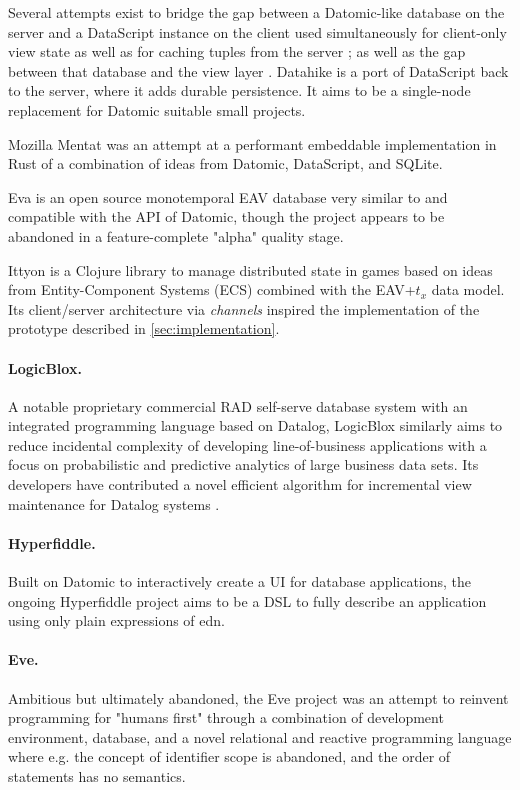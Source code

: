 Several attempts exist to bridge the gap between a Datomic-like database on the server and a DataScript instance on the client used simultaneously for client-only view state as well as for caching tuples from the server \cite{small16datscript}; as well as the gap between that database and the view layer \cite{parker15posh,krivosheev19reposh}. Datahike \cite{datahike} is a port of DataScript back to the server, where it adds durable persistence. It aims to be a single-node replacement for Datomic suitable small projects.

Mozilla Mentat \cite{mozillamentat} was an attempt at a performant embeddable implementation in Rust of a combination of ideas from Datomic, DataScript, and SQLite.

Eva \cite{eva} is an open source monotemporal EAV database very similar to and compatible with the \gls{API} of Datomic, though the project appears to be abandoned in a feature-complete "alpha" quality stage.

Ittyon \cite{ittyon} is a Clojure library to manage distributed state in games based on ideas from Entity-Component Systems (ECS) combined with the EAV+$t_x$ data model. Its client/server architecture via \emph{channels} inspired the implementation of the prototype described in \autoref{sec:implementation}.

\paragraph{LogicBlox.} A notable proprietary commercial RAD self-serve database system with an integrated programming language based on Datalog, LogicBlox \cite{aref2015design} similarly aims to reduce incidental complexity of developing line-of-business applications with a focus on probabilistic and predictive analytics of large business data sets. Its developers have contributed a novel efficient algorithm for incremental view maintenance for Datalog systems \cite{veldhuizen2012leapfrog}.


\paragraph{Hyperfiddle.} Built on Datomic to interactively create a \gls{UI} for database applications, the ongoing Hyperfiddle project \cite{getz18hyperfiddle} aims to be a \gls{DSL} to fully describe an application using only plain expressions of \gls{edn}.


\paragraph{Eve.} Ambitious but ultimately abandoned, the Eve project \cite{eve} was an attempt to reinvent programming for "humans first" through a combination of development environment, database, and a novel relational and reactive programming language where e.g. the concept of identifier scope is abandoned, and the order of statements has no semantics.
